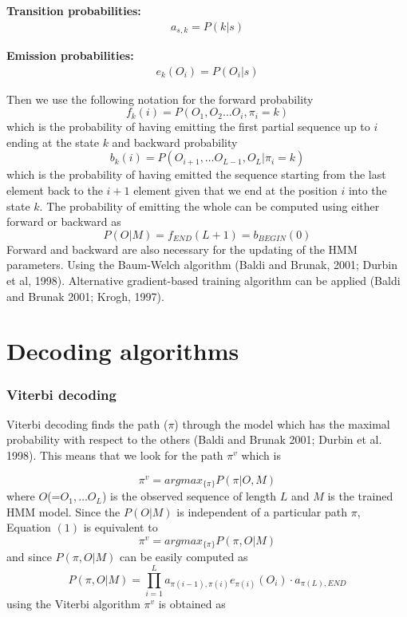 \documentclass[11pt,english]{article}
\begin{document}
{\bf Transition probabilities:} 
\begin{eqnarray}
a_{s,k}= P(k|s)
\end{eqnarray}

{\bf Emission probabilities:} 
\begin{eqnarray}
e_{k}(O_{i})= P(O_{i}|s) 
\end{eqnarray}

\noindent
Then we use the following notation for the forward probability
\begin{equation}
f_{k}(i) = P(O_{1},O_{2}\dots O_{i},\pi_{i}=k)
\end{equation}
which is the probability of having emitting the first partial 
sequence up to $i$ ending at the state $k$ and backward probability
\begin{equation}
b_{k}(i) = P(O_{i+1},\dots O_{L-1},O_{L}|\pi_{i}=k)
\end{equation}
which is the probability of having emitted the sequence starting 
from the last element back to the $i+1$ element given that we  end 
at the position $i$ into the state $k$. 
The probability of emitting the whole can be computed using either 
forward or backward as
\begin{equation}
P(O|M)=f_{END}(L+1)=b_{BEGIN}(0)
\end{equation}
Forward and backward are also necessary for the updating of the 
HMM parameters. Using the Baum-Welch algorithm (Baldi and Brunak, 
2001; Durbin et al, 1998).
Alternative gradient-based training 
algorithm can be applied (Baldi and Brunak 2001; Krogh, 1997). 


\section{Decoding algorithms}

\subsubsection*{Viterbi decoding}

Viterbi decoding finds the path ($\pi$) through the model 
which has the maximal probability with respect to the others 
(Baldi and Brunak 2001; Durbin et al. 1998). This means that 
we look for the path $\pi^{v}$  which is

\begin{equation}
\pi^{v}= argmax_{\{\pi\}}P(\pi|O,M)
\end{equation}
where $O$(=$O_{1},\dots O_{L}$) is the observed sequence 
of length $L$ and $M$ is the trained HMM model. Since the $P(O|M)$ 
is independent of a particular path $\pi$, Equation $(1)$
is equivalent to 
%
\begin{equation}
\pi^{v}= argmax_{\{\pi\}}P(\pi,O|M)
\end{equation}
and since $P(\pi,O|M)$ can be easily computed 
as 
\begin{equation}
P(\pi,O|M)=\prod_{i=1}^{L}a_{\pi(i-1),\pi(i)}e_{\pi(i)}(O_i)\cdot a_{\pi(L),END}
\end{equation}
using the Viterbi algorithm $\pi^{v}$ is obtained as
\end{document}
